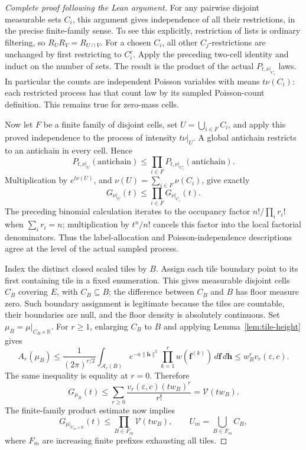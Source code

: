 \begin{proof}[Complete proof following the Lean argument]
For any pairwise disjoint measurable sets \(C_i\), this argument gives
independence of all their restrictions, in the precise finite-family
sense. To see this explicitly, restriction of lists is ordinary filtering,
so \(R_U R_V=R_{U\cap V}\). For a chosen \(C_i\), all other
\(C_j\)-restrictions are unchanged by first restricting to \(C_i^c\).
Apply the preceding two-cell identity and induct on the number of sets.
The result is the product of the actual \(P_{t,\nu|_{C_i}}\) laws.
In particular the counts are independent Poisson variables with means
\(t\nu(C_i)\): each restricted process has that count law by its
sampled Poisson-count definition. This remains true for zero-mass cells.

Now let \(F\) be a finite family of disjoint cells, set
\(U=\bigcup_{i\in F}C_i\), and apply this proved independence to the
process of intensity \(t\nu|_U\). A global antichain restricts to an
antichain in every cell. Hence
\[
 P_{t,\nu|_U}(\text{antichain})
     \le\prod_{i\in F}P_{t,\nu|_{C_i}}(\text{antichain}).
\]
Multiplication by \(e^{t\nu(U)}\), and
\(\nu(U)=\sum_{i\in F}\nu(C_i)\), give exactly
\[
             G_{\nu|_U}(t)\le\prod_{i\in F}G_{\nu|_{C_i}}(t).
\]
The preceding binomial calculation iterates to the occupancy factor
\(n!/\prod_i r_i!\) when \(\sum_i r_i=n\); multiplication by
\(t^n/n!\) cancels this factor into the local factorial denominators.
Thus the label-allocation and Poisson-independence descriptions agree
at the level of the actual sampled process.

Index the distinct closed scaled tiles by \(B\).
Assign each tile boundary point to its first containing tile in a
fixed enumeration. This gives measurable disjoint cells \(C_B\)
covering \(E\), with \(C_B\subseteq B\); the difference between \(C_B\)
and \(B\) has floor measure zero. Such boundary assignment is legitimate
because the tiles are countable, their boundaries are null, and the
floor density is absolutely continuous. Set
\(\mu_B=\mu|_{C_B\times\mathbb R}\).
For \(r\ge1\), enlarging \(C_B\) to \(B\) and applying
Lemma~\ref{lem:tile-height} gives
\[
 A_r(\mu_B)
 \le\frac{1}{(2\pi)^{r/2}}
       \int_{\mathcal A_r(B)}e^{-a\|\mathbf h\|^2}
                          \prod_{k=1}^rw(\mathbf f^{(k)})
                          \,d\mathbf f\,d\mathbf h
 \le w_B^r v_r(\varepsilon,c).
\]
The same inequality is equality at \(r=0\). Therefore
\[
 G_{\mu_B}(t)\le
       \sum_{r\ge0}\frac{v_r(\varepsilon,c)(tw_B)^r}{r!}
       =\mathcal V(tw_B).
\]
The finite-family product estimate now implies
\[
 G_{\mu|_{U_m\times\mathbb R}}(t)
       \le\prod_{B\in F_m}\mathcal V(tw_B),
 \qquad U_m=\bigcup_{B\in F_m}C_B,
\]
where \(F_m\) are increasing finite prefixes exhausting all tiles.


\end{proof}
